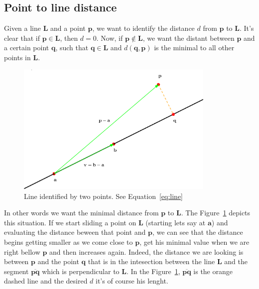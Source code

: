 \subsection{Point to line distance}
\label{sec:point2line}

Given a line $\mathbf{L}$ and a point $\mathbf{p}$, we want to identify the distance $d$ from $\mathbf{p}$ to $\mathbf{L}$.
It's clear that if $\mathbf{p} \in \mathbf{L}$, then $d = 0$.
Now, if $\mathbf{p} \notin \mathbf{L}$, we want the distant between $\mathbf{p}$ and a certain point $\mathbf{q}$, such that $\mathbf{q} \in \mathbf{L}$ and $d(\mathbf{q}, \mathbf{p})$ is the minimal to all other points in $\mathbf{L}$.

\begin{figure}[htb]
  \centering
  \includegraphics[width=0.85\textwidth]{img/line2point}
  \caption{Line identified by two points. See Equation~\ref{eq:line} }
  \label{fig:point2line}
\end{figure}

In other words we want the minimal distance from $\mathbf{p}$ to $\mathbf{L}$.
The Figure~\ref{fig:point2line} depicts this situation.
If we start sliding a point on $\mathbf{L}$ (starting lets say at $\mathbf{a}$) and evaluating the distance beween that point and $\mathbf{p}$, we can see that the distance begins getting smaller as we come close to $\mathbf{p}$, get his minimal value when we are right bellow $\mathbf{p}$ and then increases again. 
Indeed, the distance we are looking is between $\mathbf{p}$ and the point $\mathbf{q}$ that is in the intesection between the line $\mathbf{L}$ and the segment $\overline{\mathbf{p} \mathbf{q}}$ which is perpendicular to $\mathbf{L}$.
In the Figure~\ref{fig:point2line}, $\overline{\mathbf{p} \mathbf{q}}$ is the orange dashed line and the desired $d$ it's of course his lenght.

